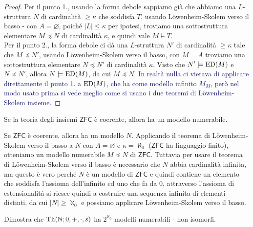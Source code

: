 \begin{proof}
    Per il punto 1., usando la forma debole sappiamo già che abbiamo una $L$-struttura $N$ di cardinalità $\geq \kappa$ che soddisfa $T$, usando Löwenheim-Skolem verso il basso - con $A = \varnothing$, poiché $|L| \leq \kappa$ per ipotesi, troviamo una sottostruttura elementare $M \preceq N$ di cardinalità $\kappa$, e quindi vale $M \models T$.\\
    Per il punto 2., la forma debole ci dà una $L$-struttura $N'$ di cardinalità $\geq \kappa$ tale che $M \preceq N'$, usando Löwenheim-Skolem verso il basso, con $M = A$ troviamo una sottostruttura elementare $N \preceq N'$ di cardinalità $\kappa$.
    Visto che $N' \models \operatorname{ED}(M)$ e $N \preceq N'$, allora $N \models \operatorname{ED}(M)$, da cui $M \preceq N$. \textcolor{MidnightBlue}{In realtà nulla ci vietava di applicare direttamente il punto 1. a $\operatorname{ED}(M)$, che ha come modello infinito $M_M$, però nel modo usato prima si vede meglio come si usano i due teoremi di Löwenheim-Skolem insieme.}
\end{proof}

\begin{exercise}
    Se la teoria degli insiemi $\mathsf{ZFC}$ è coerente, allora ha un modello numerabile.
\end{exercise}

\begin{soln}
    Se $\mathsf{ZFC}$ è coerente, allora ha un modello $N$. Applicando il teorema di Löwenheim-Skolem verso il basso a $N$ con $A = \varnothing$ e $\kappa = \aleph_0$ ($\mathsf{ZFC}$ ha linguaggio finito), otteniamo un modello numerabile $M \preceq N$ di $\mathsf{ZFC}$.
    Tuttavia per usare il teorema di Löwenheim-Skolem verso il basso è necessario che $N$ abbia cardinalità infinita, ma questo è vero perché $N$ è un modello di $\mathsf{ZFC}$ e quindi contiene un elemento che soddisfa l'assioma dell'infinito ed uno che fa da 0, attraverso l'assioma di estensionalità
    si riesce quindi a costruire una sequenza infinita di elementi distinti, da cui $|N| \geq \aleph_0$ e possiamo applicare Löwenheim-Skolem verso il basso. 
\end{soln}

\begin{exercise}
    Dimostra che $\operatorname{Th}(\mathbb N; 0, + , \cdot, s)$ ha $2^{\aleph_0}$ modelli numerabili - non isomorfi.%
\end{exercise}

